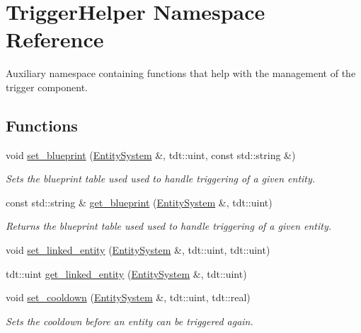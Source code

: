 \hypertarget{namespace_trigger_helper}{}\section{Trigger\+Helper Namespace Reference}
\label{namespace_trigger_helper}


Auxiliary namespace containing functions that help with the management of the trigger component.  


\subsection*{Functions}
\begin{DoxyCompactItemize}
\item 
void \hyperlink{namespace_trigger_helper_a498aa9ef87bc77651f11a80bcf886dcb}{set\+\_\+blueprint} (\hyperlink{class_entity_system}{Entity\+System} \&, tdt\+::uint, const std\+::string \&)
\begin{DoxyCompactList}\small\item\em Sets the blueprint table used used to handle triggering of a given entity. \end{DoxyCompactList}\item 
const std\+::string \& \hyperlink{namespace_trigger_helper_a6ef5fc39c7faddee9ef3feacc01eb68d}{get\+\_\+blueprint} (\hyperlink{class_entity_system}{Entity\+System} \&, tdt\+::uint)
\begin{DoxyCompactList}\small\item\em Returns the blueprint table used used to handle triggering of a given entity. \end{DoxyCompactList}\item 
void \hyperlink{namespace_trigger_helper_a0819ac0161767869834776b9ccc3229d}{set\+\_\+linked\+\_\+entity} (\hyperlink{class_entity_system}{Entity\+System} \&, tdt\+::uint, tdt\+::uint)
\item 
tdt\+::uint \hyperlink{namespace_trigger_helper_a9baf73963dc9d1c108a5959c26148025}{get\+\_\+linked\+\_\+entity} (\hyperlink{class_entity_system}{Entity\+System} \&, tdt\+::uint)
\item 
void \hyperlink{namespace_trigger_helper_a0ff785480fb2ae5c9e9b9abf67447c79}{set\+\_\+cooldown} (\hyperlink{class_entity_system}{Entity\+System} \&, tdt\+::uint, tdt\+::real)
\begin{DoxyCompactList}\small\item\em Sets the cooldown before an entity can be triggered again. \end{DoxyCompactList}\item 

\end{DoxyCompactItemize}
